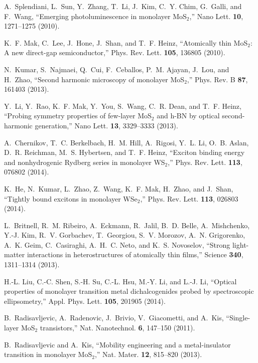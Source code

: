 \documentclass{osa-article}
\begin{document}
\begin{thebibliography}{1}
A.~Splendiani, L.~Sun, Y.~Zhang, T.~Li, J.~Kim, C.~Y. Chim, G.~Galli, and
  F.~Wang, \enquote{Emerging photoluminescence in monolayer {MoS$_2$},} Nano
  Lett. \textbf{10}, 1271--1275 (2010).

K.~F. Mak, C.~Lee, J.~Hone, J.~Shan, and T.~F. Heinz, \enquote{Atomically thin
  {MoS$_2$}: A new direct-gap semiconductor,} Phys. Rev. Lett. \textbf{105},
  136805 (2010).

N.~Kumar, S.~Najmaei, Q.~Cui, F.~Ceballos, P.~M. Ajayan, J.~Lou, and H.~Zhao,
  \enquote{Second harmonic microscopy of monolayer {MoS$_{2}$},} Phys. Rev. B
  \textbf{87}, 161403 (2013).

Y.~Li, Y.~Rao, K.~F. Mak, Y.~You, S.~Wang, C.~R. Dean, and T.~F. Heinz,
  \enquote{Probing symmetry properties of few-layer {MoS$_2$} and {h-BN} by
  optical second-harmonic generation,} Nano Lett. \textbf{13}, 3329--3333
  (2013).

A.~Chernikov, T.~C. Berkelbach, H.~M. Hill, A.~Rigosi, Y.~L. Li, O.~B. Aslan,
  D.~R. Reichman, M.~S. Hybertsen, and T.~F. Heinz, \enquote{Exciton binding
  energy and nonhydrogenic {R}ydberg series in monolayer {WS$_2$},} Phys. Rev.
  Lett. \textbf{113}, 076802 (2014).

K.~He, N.~Kumar, L.~Zhao, Z.~Wang, K.~F. Mak, H.~Zhao, and J.~Shan,
  \enquote{Tightly bound excitons in monolayer {WSe$_2$},} Phys. Rev. Lett.
  \textbf{113}, 026803 (2014).

L.~Britnell, R.~M. Ribeiro, A.~Eckmann, R.~Jalil, B.~D. Belle, A.~Mishchenko,
  Y.-J. Kim, R.~V. Gorbachev, T.~Georgiou, S.~V. Morozov, A.~N. Grigorenko,
  A.~K. Geim, C.~Casiraghi, A.~H.~C. Neto, and K.~S. Novoselov, \enquote{Strong
  light-matter interactions in heterostructures of atomically thin films,}
  Science \textbf{340}, 1311--1314 (2013).

H.-L. Liu, C.-C. Shen, S.-H. Su, C.-L. Hsu, M.-Y. Li, and L.-J. Li,
  \enquote{Optical properties of monolayer transition metal dichalcogenides
  probed by spectroscopic ellipsometry,} Appl. Phys. Lett. \textbf{105}, 201905
  (2014).

B.~Radisavljevic, A.~Radenovic, J.~Brivio, V.~Giacometti, and A.~Kis,
  \enquote{Single-layer {MoS$_2$} transistors,} Nat. Nanotechnol. \textbf{6},
  147--150 (2011).

B.~Radisavljevic and A.~Kis, \enquote{Mobility engineering and a
  metal-insulator transition in monolayer {MoS$_2$},} Nat. Mater. \textbf{12},
  815--820 (2013).


\end{thebibliography}
\end{document}
